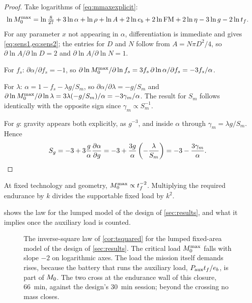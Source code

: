 \begin{proof}
Take logarithms of \cref{eq:mmaxexplicit}:
\[
  \ln M_0^{\max} = \ln\tfrac{8}{27} + 3\ln\alpha + \ln\rho + \ln A
              + 2\ln e_b + 2\ln\mathrm{FM} + 2\ln\eta - 3\ln g - 2\ln t_f .
\]
For any parameter $x$ not appearing in $\alpha$, differentiation is immediate
and gives \cref{eq:sens1,eq:sens2}; the entries for $D$ and $N$ follow from
$A = N\pi D^2/4$, so $\partial\ln A/\partial\ln D = 2$ and
$\partial\ln A/\partial \ln N = 1$.

For $f_s$: $\partial\alpha/\partial f_s = -1$, so
$\partial \ln M_0^{\max}/\partial\ln f_s = 3 f_s\,\partial\ln\alpha/\partial f_s
= -3f_s/\alpha$.

For $\lambda$: $\alpha = 1-f_s-\lambda g/S_m$, so
$\partial\alpha/\partial\lambda = -g/S_m$ and
$\partial\ln M_0^{\max}/\partial\ln\lambda
= 3\lambda(-g/S_m)/\alpha = -3\gamma_m/\alpha$. The result for $S_m$ follows
identically with the opposite sign since $\gamma_m\propto S_m^{-1}$.

For $g$: gravity appears both explicitly, as $g^{-3}$, and inside $\alpha$
through $\gamma_m = \lambda g/S_m$. Hence
\[
  S_g = -3 + 3\frac{g}{\alpha}\frac{\partial \alpha}{\partial g}
      = -3 + \frac{3g}{\alpha}\left(-\frac{\lambda}{S_m}\right)
      = -3 - \frac{3\gamma_m}{\alpha}. \qedhere
\]
\end{proof}

\begin{corollary}
\label{cor:tsquared}
At fixed technology and geometry, $M_0^{\max} \propto t_f^{-2}$. Multiplying the
required endurance by $k$ divides the supportable fixed load by $k^2$.
\end{corollary}

 shows the law for the lumped model of the design of
\cref{sec:results}, and what it implies once the auxiliary load is counted.

\begin{figure}[tbp]
\centering

\caption{The inverse-square law of \cref{cor:tsquared} for the lumped
fixed-area model of the design of \cref{sec:results}. The critical load
$M_0^{\max}$ falls with slope $-2$ on logarithmic axes. The load the mission itself
demands rises, because the battery that runs the auxiliary load,
$P_{\mathrm{aux}} t_f/e_b$, is part of $M_0$. The two cross at the endurance wall of
this closure, \SI{66}{\minute}, against the design's \SI{30}{\minute} session;
beyond the crossing no mass closes.}
\label{fig:walltf}
\end{figure}

